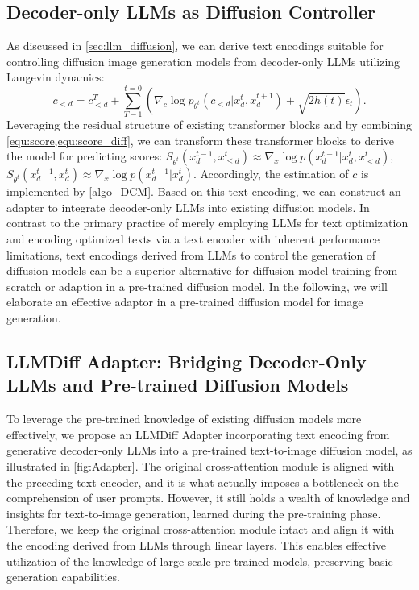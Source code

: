 \subsection{Decoder-only LLMs as Diffusion Controller}
As discussed in \cref{sec:llm_diffusion}, we can derive text encodings suitable for controlling diffusion image generation models from decoder-only LLMs utilizing Langevin dynamics:
\begin{equation}
\label{equ:Langevin}
c_{<d} = c^T_{<d} + \sum_{T-1}^{t=0} \left( \nabla_c \log p_{\theta^t}(c_{<d}|x^t_{d}, x^{t+1}_d) + \sqrt{2h(t)} \epsilon_t \right).
\end{equation}
Leveraging the residual structure of existing transformer blocks and by combining \cref{equ:score,equ:score_diff}, we can transform these transformer blocks to derive the model for predicting scores: $S_{\theta^t}(x^{t-1}_d, x^{t}_{\leq d}) \approx \nabla_x \log p(x^{t-1}_d|x^t_d, x^t_{<d})$, $S_{\theta^t}(x^{t-1}_d, x^{t}_{d}) \approx \nabla_x \log p(x^{t-1}_d|x^t_d)$.
Accordingly, the estimation of $c$ is implemented by \cref{algo_DCM}.
Based on this text encoding, we can construct an adapter to integrate decoder-only LLMs into existing diffusion models. %
In contrast to the primary practice of merely employing LLMs for text optimization and encoding optimized texts via a text encoder with inherent performance limitations, text encodings derived from LLMs to control the generation of diffusion models can be a superior alternative for diffusion model training from scratch or adaption in a pre-trained diffusion model. In the following, we will elaborate an effective adaptor in a pre-trained diffusion model for image generation.

\subsection{LLMDiff Adapter: Bridging Decoder-Only LLMs and Pre-trained Diffusion Models}
To leverage the pre-trained knowledge of existing diffusion models more effectively, we propose an LLMDiff Adapter incorporating text encoding from generative decoder-only LLMs into a pre-trained text-to-image diffusion model, as illustrated in \cref{fig:Adapter}. The original cross-attention module is aligned with the preceding text encoder, and it is what actually imposes a bottleneck on the comprehension of user prompts. 
However, it still holds a wealth of knowledge and insights for text-to-image generation, learned during the pre-training phase.
Therefore, we keep the original cross-attention module intact and align it with the encoding derived from LLMs through linear layers. 
This enables effective utilization of the knowledge of large-scale pre-trained models, preserving basic generation capabilities.

